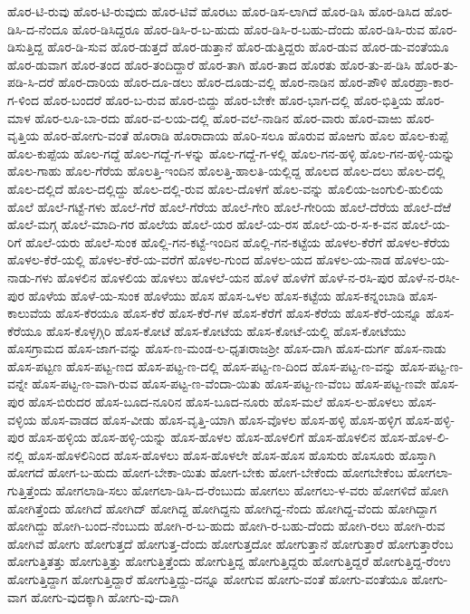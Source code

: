 ಹೊರ-ಟಿ-ರುವು
ಹೊರ-ಟಿ-ರುವುದು
ಹೊರ-ಟಿವೆ
ಹೊರಟು
ಹೊರ-ಡಿಸ-ಲಾಗಿದೆ
ಹೊರ-ಡಿಸಿ
ಹೊರ-ಡಿಸಿದ
ಹೊರ-ಡಿಸಿ-ದ-ನೆಂದೂ
ಹೊರ-ಡಿಸಿದ್ದರೂ
ಹೊರ-ಡಿಸಿ-ರ-ಬ-ಹುದು
ಹೊರ-ಡಿಸಿ-ರ-ಬಹು-ದೆಂದು
ಹೊರ-ಡಿಸಿ-ರುವ
ಹೊರ-ಡಿಸುತ್ತಿದ್ದ
ಹೊರ-ಡಿ-ಸುವ
ಹೊರ-ಡುತ್ತದೆ
ಹೊರ-ಡುತ್ತಾನೆ
ಹೊರ-ಡುತ್ತಿದ್ದರು
ಹೊರ-ಡುವ
ಹೊರ-ಡು-ವಂತೆಯೂ
ಹೊರ-ಡುವಾಗ
ಹೊರ-ತಂದ
ಹೊರ-ತಂದಿದ್ದಾರೆ
ಹೊರ-ತಾಗಿ
ಹೊರ-ತಾದ
ಹೊರತು
ಹೊರ-ತು-ಪ-ಡಿಸಿ
ಹೊರ-ತು-ಪಡಿ-ಸಿ-ದರೆ
ಹೊರ-ದಾರಿಯ
ಹೊರ-ದೂ-ಡಲು
ಹೊರ-ದೂಡು-ವಲ್ಲಿ
ಹೊರ-ನಾಡಿನ
ಹೊರ-ಪೌಳಿ
ಹೊರಪ್ರಾ-ಕಾರ-ಗ-ಳಿಂದ
ಹೊರ-ಬಂದರೆ
ಹೊರ-ಬ-ರುವ
ಹೊರ-ಬಿದ್ದು
ಹೊರ-ಬೇಕೇ
ಹೊರ-ಭಾಗ-ದಲ್ಲಿ
ಹೊರ-ಭಿತ್ತಿಯ
ಹೊರ-ಮಾಳ
ಹೊರ-ಲೂ-ಬಾ-ರದು
ಹೊರ-ವ-ಲಯ-ದಲ್ಲಿ
ಹೊರ-ವಲೆ-ನಾಡಿನ
ಹೊರ-ವಾರು
ಹೊರ-ವಾಱು
ಹೊರ-ವೃತ್ತಿಯ
ಹೊರ-ಹೋಗು-ವಂತೆ
ಹೊರಾಡಿ
ಹೊರಾದಾಯ
ಹೊರಿ-ಸಲೂ
ಹೊರುವ
ಹೊಱಗು
ಹೊಲ
ಹೊಲ-ಕುಪ್ಪೆ
ಹೊಲ-ಕುಪ್ಪೆಯ
ಹೊಲ-ಗದ್ದೆ
ಹೊಲ-ಗದ್ದೆ-ಗ-ಳನ್ನು
ಹೊಲ-ಗದ್ದೆ-ಗ-ಳಲ್ಲಿ
ಹೊಲ-ಗನ-ಹಳ್ಳಿ
ಹೊಲ-ಗನ-ಹಳ್ಳಿ-ಯನ್ನು
ಹೊಲ-ಗಾಹು
ಹೊಲ-ಗೆರೆಯ
ಹೊಲತ್ತಿ-ಇಂದಿನ
ಹೊಲತ್ತಿ-ಹಾಲತಿ-ಯಲ್ಲಿದ್ದ
ಹೊಲದ
ಹೊಲ-ದಲು
ಹೊಲ-ದಲ್ಲಿ
ಹೊಲ-ದಲ್ಲಿದೆ
ಹೊಲ-ದಲ್ಲಿದ್ದು
ಹೊಲ-ದಲ್ಲಿ-ರುವ
ಹೊಲ-ದೊಳಗೆ
ಹೊಲ-ವನ್ನು
ಹೊಲಿಯ-ಜಂಗುಲಿ-ಹುಲಿಯ
ಹೊಲೆ
ಹೊಲೆ-ಗಟ್ಟೆ-ಗಳು
ಹೊಲೆ-ಗೆರೆ
ಹೊಲೆ-ಗೆರೆಯ
ಹೊಲೆ-ಗೇರಿ
ಹೊಲೆ-ಗೇರಿಯ
ಹೊಲೆ-ದೆರೆಯ
ಹೊಲೆ-ದೆಱೆ
ಹೊಲೆ-ಮಗ್ಗ
ಹೊಲೆ-ಮಾದಿ-ಗರ
ಹೊಲೆಯ
ಹೊಲೆ-ಯರ
ಹೊಲೆ-ಯ-ರಸ
ಹೊಲೆ-ಯ-ರ-ಸ-ಕ-ವನ
ಹೊಲೆ-ಯ-ರಿಗೆ
ಹೊಲೆ-ಯರು
ಹೊಲೆ-ಸುಂಕ
ಹೊಲ್ಲಿ-ಗನ-ಕಟ್ಟೆ-ಇಂದಿನ
ಹೊಲ್ಲಿ-ಗನ-ಕಟ್ಟೆಯ
ಹೊಳಲ-ಕೆರೆಗೆ
ಹೊಳಲ-ಕೆರೆಯ
ಹೊಳಲ-ಕೆರೆ-ಯಲ್ಲಿ
ಹೊಳಲ-ಕೆರೆ-ಯ-ವರೆಗೆ
ಹೊಳಲ-ಗುಂದ
ಹೊಳಲ-ಯದ
ಹೊಳಲ-ಯ-ನಾಡ
ಹೊಳಲ-ಯ-ನಾಡು-ಗಳು
ಹೊಳಲಿನ
ಹೊಳಲಿಯ
ಹೊಳಲು
ಹೊಳಲೆ-ಯನ
ಹೊಳೆ
ಹೊಳೆಗೆ
ಹೊಳೆ-ನ-ರಸಿ-ಪುರ
ಹೊಳೆ-ನ-ರಸೀ-ಪುರ
ಹೊಳೆಯ
ಹೊಳೆ-ಯ-ಸುಂಕ
ಹೊಳೆಯು
ಹೊಸ
ಹೊಸ-ಒಳಲ
ಹೊಸ-ಕಟ್ಟೆಯ
ಹೊಸ-ಕನ್ನಂಬಾಡಿ
ಹೊಸ-ಕಾಲುವೆಯ
ಹೊಸ-ಕೆರಯೂ
ಹೊಸ-ಕೆರೆ
ಹೊಸ-ಕೆರೆ-ಗಳ
ಹೊಸ-ಕೆರೆಗೆ
ಹೊಸ-ಕೆರೆಯ
ಹೊಸ-ಕೆರೆ-ಯನ್ನೂ
ಹೊಸ-ಕೆರೆಯೂ
ಹೊಸ-ಕೊಳ್ಳಗ್ಗಿರಿ
ಹೊಸ-ಕೋಟೆ
ಹೊಸ-ಕೋಟೆಯ
ಹೊಸ-ಕೋಟೆ-ಯಲ್ಲಿ
ಹೊಸ-ಕೋಟೆಯು
ಹೊಸಗ್ರಾಮದ
ಹೊಸ-ಜಾಗ-ವನ್ನು
ಹೊಸ-ಣ-ಮಂಡ-ಲ-ಧೃತಃರಾಜಶ್ರೀ
ಹೊಸ-ದಾಗಿ
ಹೊಸ-ದುರ್ಗ
ಹೊಸ-ನಾಡು
ಹೊಸ-ಪಟ್ಟಣ
ಹೊಸ-ಪಟ್ಟ-ಣದ
ಹೊಸ-ಪಟ್ಟ-ಣ-ದಲ್ಲಿ
ಹೊಸ-ಪಟ್ಟ-ಣ-ದಿಂದ
ಹೊಸ-ಪಟ್ಟ-ಣ-ವನ್ನು
ಹೊಸ-ಪಟ್ಟ-ಣ-ವನ್ನೇ
ಹೊಸ-ಪಟ್ಟ-ಣ-ವಾಗಿ-ರುವ
ಹೊಸ-ಪಟ್ಟ-ಣ-ವೆಂದಾ-ಯಿತು
ಹೊಸ-ಪಟ್ಟ-ಣ-ವೆಂಬ
ಹೊಸ-ಪಟ್ಟ-ಣವೇ
ಹೊಸ-ಪುರ
ಹೊಸ-ಬಿರುದರ
ಹೊಸ-ಬೂದ-ನೂರಿನ
ಹೊಸ-ಬೂದ-ನೂರು
ಹೊಸ-ಮಲೆ
ಹೊಸ-ಲ-ಹೊಳಲು
ಹೊಸ-ವಳ್ಳಿಯ
ಹೊಸ-ವಾಡದ
ಹೊಸ-ವೀಡು
ಹೊಸ-ವೃತ್ತಿ-ಯಾಗಿ
ಹೊಸ-ವೊಳಲ
ಹೊಸ-ಹಳ್ಳಿ
ಹೊಸ-ಹಳ್ಳಿಗ
ಹೊಸ-ಹಳ್ಳಿ-ಪುರ
ಹೊಸ-ಹಳ್ಳಿಯ
ಹೊಸ-ಹಳ್ಳಿ-ಯನ್ನು
ಹೊಸ-ಹೊಳಲ
ಹೊಸ-ಹೊಳಲಿಗೆ
ಹೊಸ-ಹೊಳಲಿನ
ಹೊಸ-ಹೊಳ-ಲಿ-ನಲ್ಲಿ
ಹೊಸ-ಹೊಳಲಿನಿಂದ
ಹೊಸ-ಹೊಳಲು
ಹೊಸ-ಹೊಳಲೇ
ಹೊಸ-ಹೊಸ
ಹೊಸುರು
ಹೊಸೂರು
ಹೊಸ್ತಾಗಿ
ಹೋಗದೆ
ಹೋಗ-ಬ-ಹುದು
ಹೋಗ-ಬೇಕಾ-ಯಿತು
ಹೋಗ-ಬೇಕು
ಹೋಗ-ಬೇಕೆಂದು
ಹೋಗಬೇಕೆಂಬ
ಹೋಗಲಾ-ಗುತ್ತಿತ್ತೆಂದು
ಹೋಗಲಾಡಿ-ಸಲು
ಹೋಗಲಾ-ಡಿಸಿ-ದ-ರೆಂಬುದು
ಹೋಗಲು
ಹೋಗಲು-ಳ-ವರು
ಹೋಗಳಿದೆ
ಹೋಗಿ
ಹೋಗಿತ್ತೆಂದು
ಹೋಗಿದೆ
ಹೋಗಿದ್
ಹೋಗಿದ್ದ
ಹೋಗಿದ್ದನು
ಹೋಗಿದ್ದ-ನೆಂದು
ಹೋಗಿದ್ದ-ವೆಂದು
ಹೋಗಿದ್ದಾಗ
ಹೋಗಿದ್ದು
ಹೋಗಿ-ಬಂದ-ನೆಂಬುದು
ಹೋಗಿ-ರ-ಬ-ಹುದು
ಹೋಗಿ-ರ-ಬಹು-ದೆಂದು
ಹೋಗಿ-ರಲು
ಹೋಗಿ-ರುವ
ಹೋಗಿವೆ
ಹೋಗು
ಹೋಗುತ್ತದೆ
ಹೋಗುತ್ತ-ದೆಂದು
ಹೋಗುತ್ತದೋ
ಹೋಗುತ್ತಾನೆ
ಹೋಗುತ್ತಾರೆ
ಹೋಗುತ್ತಾರೆಂಬ
ಹೋಗುತ್ತಿತತ್ತು
ಹೋಗುತ್ತಿತ್ತು
ಹೋಗುತ್ತಿತ್ತೆಂದು
ಹೋಗುತ್ತಿದ್ದ
ಹೋಗುತ್ತಿದ್ದರು
ಹೋಗುತ್ತಿದ್ದರೆ
ಹೋಗುತ್ತಿದ್ದ-ರೆಂಉ
ಹೋಗುತ್ತಿದ್ದಾಗ
ಹೋಗುತ್ತಿದ್ದಾರೆ
ಹೋಗುತ್ತಿದ್ದು-ದನ್ನೂ
ಹೋಗುವ
ಹೋಗು-ವಂತೆ
ಹೋಗು-ವಂತೆಯೂ
ಹೋಗು-ವಾಗ
ಹೋಗು-ವುದಕ್ಕಾಗಿ
ಹೋಗು-ವು-ದಾಗಿ
